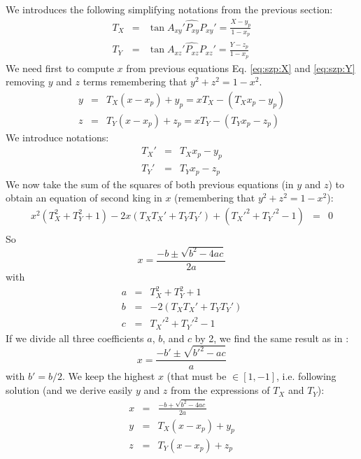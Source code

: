   We introduces the following simplifying notations from the previous section:
  \begin{eqnarray*}
    T_X & = & \tan\widehat{A_{xy}'P_{xy}P_{xy}'} = \frac{X - y_p}{1 - x_p} \\ 
    T_Y & = & \tan\widehat{A_{xz}'P_{xz}P_{xz}'} = \frac{Y - z_p}{1 - x_p}
  \end{eqnarray*}
  We need first to compute $x$ from previous equations Eq. \ref{eq:szp:X} and \ref{eq:szp:Y} removing $y$ and $z$ 
  terms remembering that $y^2 + z^2 = 1 - x^2$.
  \begin{eqnarray*}
    y & = & T_X (x - x_p) + y_p = x T_X - (T_X x_p - y_p) \\
    z & = & T_Y (x - x_p) + z_p = x T_Y - (T_Y x_p - z_p) 
  \end{eqnarray*}
  We introduce notations:
  \begin{eqnarray*}
    T_X' & = & T_X x_p - y_p \\
    T_Y' & = & T_Y x_p - z_p
  \end{eqnarray*}
  We now take the sum of the squares of both previous equations (in $y$ and $z$) to obtain an equation of second king in $x$ (remembering that $y^2 + z^2 = 1 - x^2$):
  \begin{eqnarray*}
    x^2(T_X^2 + T_Y^2 + 1) -2x(T_X T_X' + T_Y T_Y')  + (T_X'^2 + T_Y'^2 - 1) & = & 0 \\
  \end{eqnarray*}
  So
  \begin{equation}
    x = \frac{-b\pm \sqrt{b^2 - 4ac}}{2a}
  \end{equation}
  with
  \begin{eqnarray*}
    a & = & T_X^2 + T_Y^2 + 1 \\
    b & = & -2(T_X T_X' + T_Y T_Y')  \\
    c & = & T_X'^2 + T_Y'^2 - 1
  \end{eqnarray*}
  If we divide all three coefficients $a$, $b$, and $c$ by 2, we find the same result as in \cite{Calabretta2002}:
  \begin{equation*}
    x = \frac{-b'\pm \sqrt{b'^2 - ac}}{a}
  \end{equation*}
  with $b' = b/2$.
  We keep the highest $x$ (that must be $\in [1, -1]$, i.e. following solution (and we derive easily $y$ and $z$
  from the expressions of $T_X$ and $T_Y$):
  \begin{eqnarray}
    x & = & \frac{-b + \sqrt{b^2 - 4ac}}{2a} \\
    y & = & T_X(x - x_p) + y_p \\
    z & = & T_Y(x - x_p) + z_p
  \end{eqnarray}

